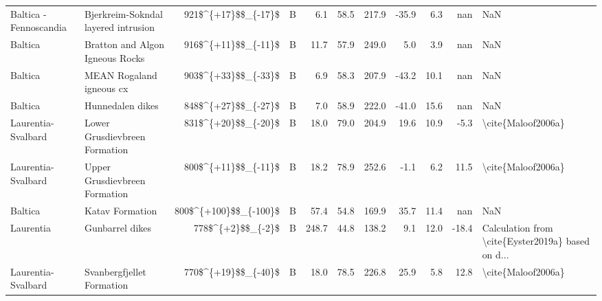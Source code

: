 \begin{longtable}{p{1 in}p{1 in}rrrrrrrr}
        Baltica - Fennoscandia &                Bjerkreim-Sokndal layered intrusion &    921\$\textasciicircum \{+17\}\$\$\_\{-17\}\$ &      B &       6.1 &      58.5 & 217.9 & -35.9 &       6.3 &         nan &                                                NaN \\
                       Baltica &                    Bratton and Algon Igneous Rocks &    916\$\textasciicircum \{+11\}\$\$\_\{-11\}\$ &      B &      11.7 &      57.9 & 249.0 &   5.0 &       3.9 &         nan &                                                NaN \\
                       Baltica &                           MEAN Rogaland igneous cx &    903\$\textasciicircum \{+33\}\$\$\_\{-33\}\$ &      B &       6.9 &      58.3 & 207.9 & -43.2 &      10.1 &         nan &                                                NaN \\
                       Baltica &                                   Hunnedalen dikes &    848\$\textasciicircum \{+27\}\$\$\_\{-27\}\$ &      B &       7.0 &      58.9 & 222.0 & -41.0 &      15.6 &         nan &                                                NaN \\
            Laurentia-Svalbard &                      Lower Grusdievbreen Formation &    831\$\textasciicircum \{+20\}\$\$\_\{-20\}\$ &      B &      18.0 &      79.0 & 204.9 &  19.6 &      10.9 &        -5.3 &                                 \textbackslash cite\{Maloof2006a\} \\
            Laurentia-Svalbard &                      Upper Grusdievbreen Formation &    800\$\textasciicircum \{+11\}\$\$\_\{-11\}\$ &      B &      18.2 &      78.9 & 252.6 &  -1.1 &       6.2 &        11.5 &                                 \textbackslash cite\{Maloof2006a\} \\
                       Baltica &                                    Katav Formation &  800\$\textasciicircum \{+100\}\$\$\_\{-100\}\$ &      B &      57.4 &      54.8 & 169.9 &  35.7 &      11.4 &         nan &                                                NaN \\
                     Laurentia &                                    Gunbarrel dikes &      778\$\textasciicircum \{+2\}\$\$\_\{-2\}\$ &      B &     248.7 &      44.8 & 138.2 &   9.1 &      12.0 &       -18.4 &  Calculation from \textbackslash cite\{Eyster2019a\} based on d... \\
            Laurentia-Svalbard &                          Svanbergfjellet Formation &    770\$\textasciicircum \{+19\}\$\$\_\{-40\}\$ &      B &      18.0 &      78.5 & 226.8 &  25.9 &       5.8 &        12.8 &                                 \textbackslash cite\{Maloof2006a\} \\

\end{longtable}

